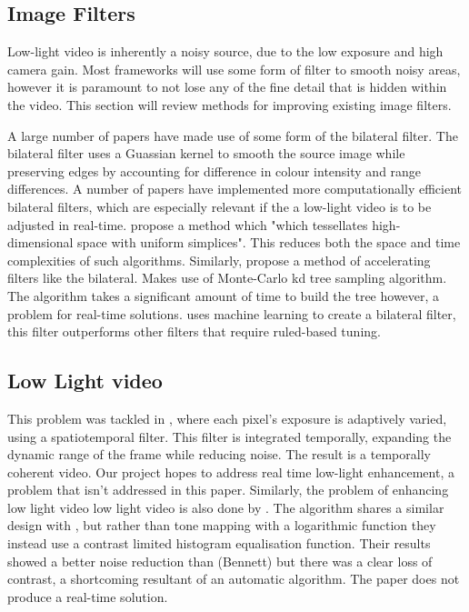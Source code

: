 \documentclass[12pt,a4paper]{article}
\begin{document}
\subsection{Image Filters}
	
	Low-light video is inherently a noisy source, due to the low exposure and high camera gain.  Most frameworks will use some form of filter to smooth noisy areas, however it is paramount to not lose any of the fine detail that is hidden within the video. This section will review methods for improving existing image filters.

	A large number of papers have made use of some form of the bilateral filter. The bilateral filter uses a Guassian kernel to smooth the source image while preserving edges by accounting for difference in colour intensity and range differences. A number of papers have implemented more computationally efficient bilateral filters, which are especially relevant if the a low-light video is to be adjusted in real-time. \cite{adams2010fast} propose a method which "which tessellates high-dimensional space with uniform simplices". This reduces both the space and time complexities of such algorithms. Similarly, \cite{Adams:2009:GKF:1531326.1531327} propose a method of accelerating filters like the bilateral. Makes use of Monte-Carlo kd tree sampling algorithm. The algorithm takes a significant amount of time to build the tree however, a problem for real-time solutions.
	\cite{frosio2015machine} uses machine learning to create a bilateral filter, this filter outperforms other filters that require ruled-based tuning.

\subsection{Low Light video}

	This problem was tackled in \cite{Bennett:2005:VEU:1073204.1073272}, where each pixel's exposure is adaptively varied, using a spatiotemporal filter. This filter is integrated temporally, expanding the dynamic range of the frame while reducing noise. The result is a temporally coherent video. Our project hopes to address real time low-light enhancement, a problem that isn't addressed in this paper. Similarly, the problem of enhancing low light video low light video is also done by \cite{malm2007adaptive}. The algorithm shares a similar design with \cite{Bennett:2005:VEU:1073204.1073272}, but rather than tone mapping with a logarithmic function they instead use a contrast limited histogram equalisation function. Their results showed a better noise reduction than (Bennett) but there was a clear loss of contrast, a shortcoming resultant of an automatic algorithm. The paper does not produce a real-time solution.
\end{document}
